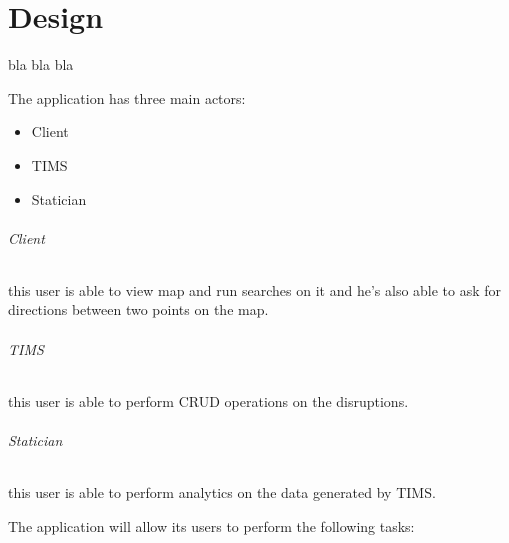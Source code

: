 
\part{Design}


bla bla bla


The application has three main actors:
\begin{itemize}
	\item Client
	\item TIMS
	\item Statician
\end{itemize}

\paragraph{Client}
this user is able to view map and run searches on it and he’s also able to ask 
for directions between two points on the map.

\paragraph{TIMS}
this user is able to perform CRUD operations on the disruptions.

\paragraph{Statician}
this user is able to perform analytics on the data generated by TIMS.


The application will allow its users to perform the following tasks:
